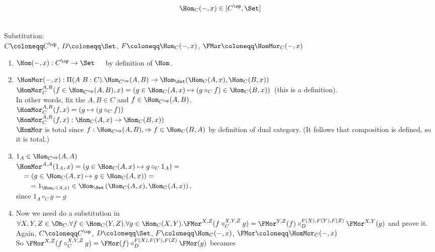 \documentclass[10pt,a4paper]{article}
\begin{document}
\begin{lemma}
$$\Hom_C(-, x) \in [C^\op,\Set]$$
\end{lemma}

\myprf\\
Substitution:\\
$C \coloneqq C^\op$, 
$D \coloneqq \Set$, 
$F \coloneqq \Hom_C(-,x)$, 
$\FMor \coloneqq \HomMor_C(-,x)$\\
\begin{enumerate}
\item $\Hom(-, x) : C^\op \to \Set$\ \ \ by definition of $\Hom$.
\item $\HomMor(-, x) :\Pi(A\ B:C).\Hom_{C^\op}(A,B) \to \Hom_\Set(\Hom_C(A,x), \Hom_C(B,x))$\\
$\HomMor_C^{A,B}(f\in\Hom_{C^\op}(A,B), x) = (g \in\Hom_C(A,x) \mapsto (g \circ_C f) \in\Hom_C(B,x))$\ (this is a definition).\\
In other words, fix the $A,B\in C$ and $f\in\Hom_{C^\op}(A,B)$.\\
$\HomMor_C^{A,B}(f, x) = (g\mapsto (g \circ_C f))$\\
$\HomMor_C^{A,B}(f, x) : \Hom_C(A,x) \to \Hom_C(B,x))$
\\
$\HomMor$ is total since $f:\Hom_{C^\op}(A,B), \Rightarrow f\in\Hom_C(B,A)$ by definition of dual category. (It follows that composition is defined, so it is total.)
\item $1_A\in\Hom_{C^\op}(A,A)$\\
$\HomMor^{A,A}(1_A, x) = \left(g \in\Hom_C(A,x)\mapsto g \circ_C 1_A\right) = $\\
$\quad = \left(g \in\Hom_C(A,x) \mapsto g \in\Hom_C(A,x)\right) =$\\
$\quad \quad = 1_{\Hom_C(A,x)} \in \Hom_\Set\left(\Hom_C(A,x), \Hom_C(A,x)\right).$\\
since $1_A \circ_C g = g$\\
\item Now we need do a substitution in
$\forall X,Y,Z \in \Ob_C.\forall f\in\Hom_C(Y,Z).\forall g\in\Hom_C(X,Y). \FMor^{X,Z}(f\circ_C^{X,Y,Z} g)=\FMor^{Y,Z}(f)\circ_D^{F(X),F(Y),F(Z)} \FMor^{X,Y}(g)$ and prove it.\\
Again, $C \coloneqq C^\op$, 
$D \coloneqq \Set$, 
$F \coloneqq \Hom_C(-,x)$, 
$\FMor \coloneqq \HomMor_C(-,x)$\\
So $\FMor^{X,Z}(f\circ_C^{X,Y,Z} g)=\FMor(f)\circ_D^{F(X),F(Y),F(Z)} \FMor(g)$ becames\\

\end{enumerate}
\end{document}
